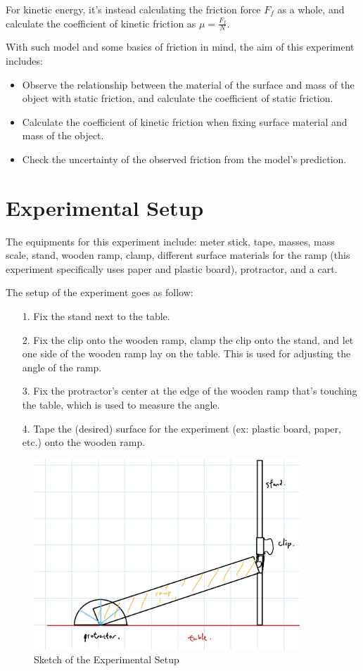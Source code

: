 \documentclass{article}
\begin{document}
For kinetic energy, it's instead calculating the friction force $F_f$ as a whole, and calculate the coefficient of kinetic friction as $\mu=\frac{F_f}{N}$.

\hfil

With such model and some basics of friction in mind, the aim of this experiment includes:
\begin{itemize}
    \item Observe the relationship between the material of the surface and mass of the object with static friction, and calculate the coefficient of static friction.
    \item Calculate the coefficient of kinetic friction when fixing surface material and mass of the object.
    \item Check the uncertainty of the observed friction from the model's prediction.
\end{itemize}

\pagebreak

\section{Experimental Setup}
The equipments for this experiment include: meter stick, tape, masses, mass scale, stand, wooden ramp, clamp, different surface materials for the ramp (this experiment specifically uses paper and plastic board), protractor, and a cart.

\hfil

The setup of the experiment goes as follow:
\begin{itemize}
    \item[1.] Fix the stand next to the table.
    \item[2.] Fix the clip onto the wooden ramp, clamp the clip onto the stand, and let one side of the wooden ramp lay on the table. This is used for adjusting the angle of the ramp.
    \item[3.] Fix the protractor's center at the edge of the wooden ramp that's touching the table, which is used to measure the angle.
    \item[4.] Tape the (desired) surface for the experiment (ex: plastic board, paper, etc.) onto the wooden ramp.
\end{itemize}

\begin{figure}[h!]
    \centering
    \includegraphics[width=100mm]{setup_sketch.jpg}
    \caption{Sketch of the Experimental Setup}
    \label{fig:sketch_setup}
\end{figure}
\end{document}
